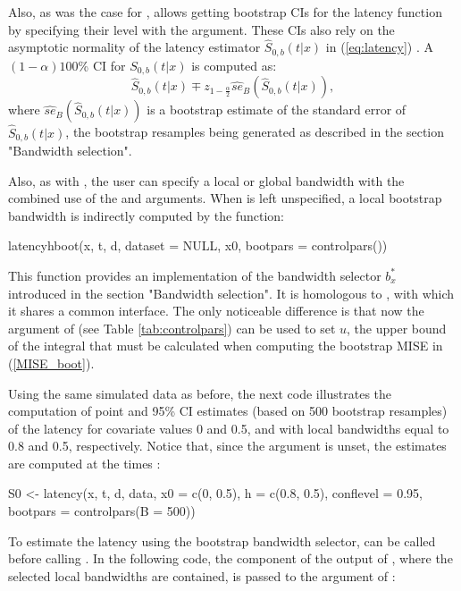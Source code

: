 Also, as was the case for ,  allows getting bootstrap CIs for the latency function by specifying their level with the  argument. These CIs also rely on the asymptotic normality of the latency estimator $\hat S_{0,b} \left(t|x \right)$ in (\ref{eq:latency}) \citep{Lopez2}. A $\left(1-\alpha \right)100$\% CI for $S_{0,b}\left(t|x \right)$ is computed as:
\begin{equation}
\hat S_{0,b} \left(t|x \right) \mp z_{1-\frac{\alpha}{2}}\widehat{se}_B\left(\hat S_{0,b} \left(t|x \right) \right),
\end{equation}
where $\widehat{se}_B\left(\hat S_{0,b} \left(t|x\right)\right)$ is a bootstrap estimate of the standard error of $\hat S_{0,b}\left(t|x \right)$, the bootstrap resamples being generated as described in the section "Bandwidth selection".

Also, as with , the user can specify a local or global bandwidth with the combined use of the  and  arguments. When  is left unspecified, a local bootstrap bandwidth is indirectly computed by the  function:
\begin{example}
latencyhboot(x, t, d, dataset = NULL, x0, bootpars = controlpars())
\end{example}

This function provides an implementation of the bandwidth selector $b_x^*$ introduced in the section "Bandwidth selection". It is homologous to , with which it shares a common interface. The only noticeable difference is that now the  argument of  (see Table \ref{tab:controlpars}) can be used to set $u$, the upper bound of the integral that must be calculated when computing the bootstrap MISE in (\ref{MISE_boot}).

Using the same simulated data as before, the next code illustrates the computation of point and 95\% CI estimates (based on 500 bootstrap resamples) of the latency for covariate values 0 and 0.5, and with local bandwidths equal to 0.8 and 0.5, respectively. Notice that, since the  argument is unset, the estimates are computed at the times :

\begin{example}
S0 <- latency(x, t, d, data, x0 = c(0, 0.5), h = c(0.8, 0.5),
   conflevel = 0.95, bootpars = controlpars(B = 500))
\end{example}


To estimate the latency using the bootstrap bandwidth selector,  can be called before calling . In the following code, the component  of the output of , where the selected local bandwidths are contained, is passed to the  argument of :

